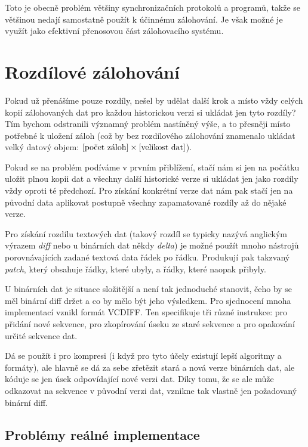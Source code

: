 Toto je obecně problém většiny synchronizačních protokolů a programů, takže se
většinou nedají samostatně použít k účinnému zálohování. Je však možné je
využít jako efektivní přenosovou část zálohovacího systému.

\section{Rozdílové zálohování}

Pokud už přenášíme pouze rozdíly, nešel by udělat další krok a místo vždy celých
kopií zálohovaných dat pro každou historickou verzi si ukládat jen tyto rozdíly?
Tím bychom odstranili významný problém nastíněný výše, a to přesněji místo
potřebné k uložení záloh (což by bez rozdílového zálohování znamenalo ukládat
velký datový objem: $[\hbox{počet záloh}]\times[\hbox{velikost dat}]$).

Pokud se na problém podíváme v prvním přiblížení, stačí nám si jen na počátku
uložit plnou kopii dat a všechny další historické verze si ukládat jen jako
rozdíly vždy oproti té předchozí. Pro získání konkrétní verze dat nám pak stačí
jen na původní data aplikovat postupně všechny zapamatované rozdíly až do nějaké
verze.

Pro získání rozdílu textových dat (takový rozdíl se typicky nazývá anglickým
výrazem {\it diff} nebo u binárních dat někdy {\it delta}) je možné použít mnoho
nástrojů porovnávajících zadané textová data řádek po řádku. Produkují pak
takzvaný {\it patch}, který obsahuje řádky, které ubyly, a řádky, které naopak
přibyly.


U binárních dat je situace složitější a není tak jednoduché stanovit, čeho by
se měl binární diff držet a co by mělo být jeho výsledkem. Pro sjednocení mnoha
implementací vznikl formát \gls{VCDIFF}. Ten specifikuje tři různé instrukce:
pro přidání nové sekvence, pro zkopírování úseku ze staré sekvence a pro
opakování určité sekvence dat.

Dá se použít i pro kompresi (i když pro tyto účely existují lepší algoritmy a
formáty), ale hlavně se dá za sebe zřetězit stará a nová verze binárních dat,
ale kóduje se jen úsek odpovídající nové verzi dat. Díky tomu, že se ale může
odkazovat na sekvence v původní verzi dat, vznikne tak vlastně jen požadovaný
binární diff.

\subsection*{Problémy reálné implementace}


